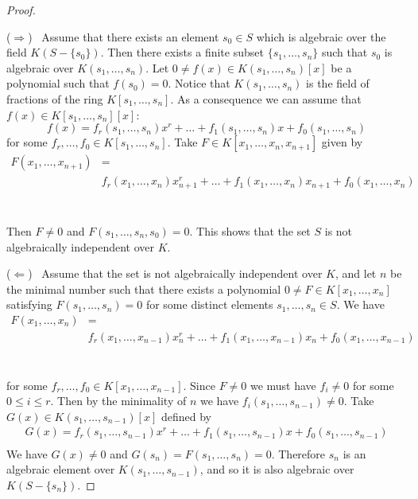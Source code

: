 \documentclass[12pt, letterpaper, oneside]{article}
\theoremstyle{plain}
\theoremstyle{definition}
\newcommand{\vs}{\vskip 5mm}
\begin{document}
\vs

\begin{proof} \  

($\Rightarrow$) \ Assume that there exists an element  $s_{0}\in S$ which is algebraic over 
the field $K(S-\{s_{0}\})$. Then there exists a finite subset $\{s_{1}, \dots, s_{n}\}$ such that $s_{0}$
is algebraic over $K(s_{1}, \dots, s_{n})$. Let $0\neq f(x)\in K(s_{1}, \dots, s_{n})[x]$ be a polynomial 
such that $f(s_{0}) = 0$. Notice that  $K(s_{1}, \dots, s_{n})$ is the field of fractions of the ring 
$K[s_{1}, \dots, s_{n}]$. As a consequence we can assume that $f(x)\in K[s_{1}, \dots, s_{n}][x]$:
$$f(x) = f_{r}(s_{1}, \dots, s_{n})x^{r} + {\dots} +  f_{1}(s_{1}, \dots, s_{n})x +  f_{0}(s_{1}, \dots, s_{n})$$
for some $f_{r}, \dots, f_{0} \in K[s_{1}, \dots, s_{n}]$. Take $F\in K[x_{1}, \dots, x_{n}, x_{n+1}]$
given by 
\begin{align*}
F(x_{1}, \dots, x_{n+1})  & =  \\ 
  & f_{r}(x_{1}, \dots, x_{n})x_{n+1}^{r} + {\dots} +  f_{1}(x_{1}, \dots, x_{n})x_{n+1} +  f_{0}(x_{1}, \dots, x_{n}) \\
\end{align*}
\ 

\vskip -13mm

Then $F\neq 0$ and $F(s_{1}, \dots, s_{n}, s_{0}) = 0$. This shows that the set $S$ is not algebraically 
independent over $K$. 

\vs\vs

($\Leftarrow$) \ Assume that the set is not algebraically independent over $K$, and let $n$ be the minimal 
number such that there exists a polynomial $0\neq F\in K[x_{1}, \dots, x_{n}]$  satisfying
$F(s_{1}, \dots, s_{n})=0$ for some distinct elements $s_{1}, \dots, s_{n} \in S$. We have 
\begin{align*}
F(x_{1}, \dots, x_{n})   & =   \\ 
 & f_{r}(x_{1}, \dots, x_{n-1})x_{n}^{r} + {\dots} + 
  f_{1}(x_{1}, \dots, x_{n-1})x_{n} +  f_{0}(x_{1}, \dots, x_{n-1}) \\
\end{align*} 
\ 

\vskip -14mm

for some $f_{r}, \dots, f_{0}\in K[x_{1}, \dots, x_{n-1}]$. Since $F\neq 0$ we must have $f_{i}\neq 0$
for some $0\leq i \leq r$. Then by the minimality of $n$ we have $f_{i}(s_{1}, \dots, s_{n-1})\neq 0$. 
Take $G(x)\in K(s_{1}, \dots, s_{n-1})[x]$ defined by 
\begin{align*}
G(x) =  f_{r}(s_{1}, \dots, s_{n-1})x^{r} 
+ {\dots} + f_{1}(s_{1}, \dots, s_{n-1})x +  f_{0}(s_{1}, \dots, s_{n-1}) \\
\end{align*} 
We have $G(x) \neq 0$ and $G(s_{n}) = F(s_{1}, \dots, s_{n}) = 0$. Therefore $s_{n}$ is 
an algebraic element over $K(s_{1}, \dots, s_{n-1})$, and so it is also algebraic over 
$K(S-\{s_{n}\})$. 


\end{proof}
\end{document}
